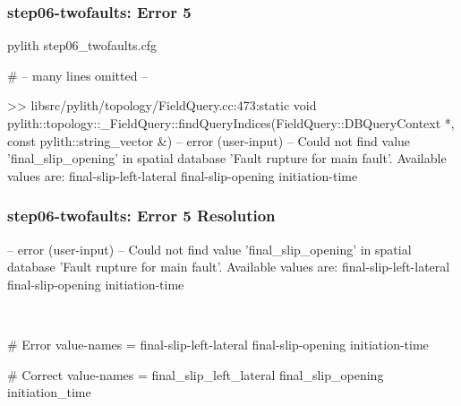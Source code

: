 \documentclass[aspectratio=169]{beamer}
\begin{document}
\begin{frame}[fragile]
  \frametitle{{\ttfamily step06-twofaults}: Error 5}

\begin{pyrejournal}
pylith step06_twofaults.cfg

# -- many lines omitted --

 >> libsrc/pylith/topology/FieldQuery.cc:473:static void pylith::topology::_FieldQuery::findQueryIndices(FieldQuery::DBQueryContext *, const pylith::string_vector &)
 -- error (user-input)
 -- Could not find value 'final_slip_opening' in spatial database 'Fault rupture for main fault'. Available values are:
  final-slip-left-lateral
  final-slip-opening
  initiation-time
\end{pyrejournal}

\end{frame}


\begin{frame}[t,fragile]
  \frametitle{{\ttfamily step06-twofaults}: Error 5 Resolution}

  \tserror
  \begin{pyrejournal}
 -- error (user-input)
 -- Could not find value 'final_slip_opening' in spatial database 'Fault rupture for main fault'. Available values are:
  final-slip-left-lateral
  final-slip-opening
  initiation-time
  \end{pyrejournal}

  \pause\\[1pt]

  \begin{cfgcode}
    # Error
    value-names = final-slip-left-lateral  final-slip-opening  initiation-time

    # Correct
    value-names = final_slip_left_lateral  final_slip_opening  initiation_time
  \end{cfgcode}

\end{frame}
\end{document}
